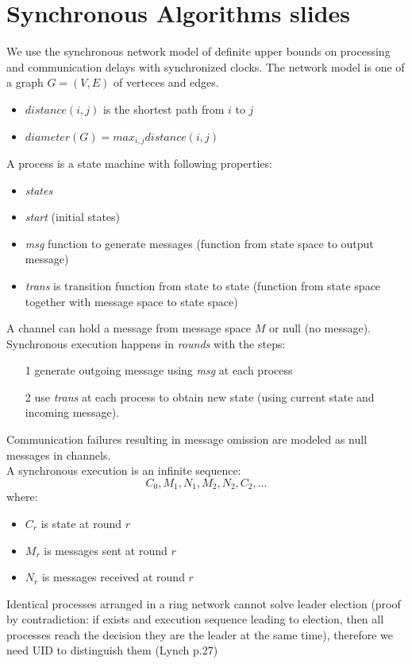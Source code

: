 \documentclass[a4paper,10pt,]{article}
\begin{document}
\section{Synchronous Algorithms slides}
We use the synchronous network model of definite upper bounds on processing and communication delays with synchronized clocks.  The network model is one of a graph $G = (V, E)$ of verteces and edges.
\begin{itemize}
  \item $distance(i,j)$ is the shortest path from $i$ to $j$
  \item $diameter(G) = max_{i,j} distance(i,j)$
\end{itemize}
A process is a state machine with following properties:
\begin{itemize}
  \item \emph{states}
  \item \emph{start} (initial states)
  \item \emph{msg} function to generate messages (function from state space to output message)
  \item \emph{trans} is transition function from state to state (function from state space together with message space to state space)
\end{itemize}
A channel can hold a message from message space $M$ or null (no message).\\
Synchronous execution happens in \emph{rounds} with the steps:
\begin{itemize}
  \item[1] generate outgoing message using \emph{msg} at each process
  \item[2] use \emph{trans} at each process to obtain new state (using current state and incoming message).
\end{itemize}
Communication failures resulting in message omission are modeled as null messages in channels.\\
A synchronous execution is an infinite sequence:
$$
C_0, M_1, N_1, M_2, N_2, C_2, \ldots
$$
where:
\begin{itemize}
  \item $C_r$ is state at round $r$
  \item $M_r$ is messages sent at round $r$
  \item $N_r$ is messages received at round $r$
\end{itemize}
Identical processes arranged in a ring network cannot solve leader election (proof by contradiction: if exists and execution sequence leading to election, then all processes reach the decision they are the leader at the same time), therefore we need UID to distinguish them (Lynch p.27)\\
\end{document}
